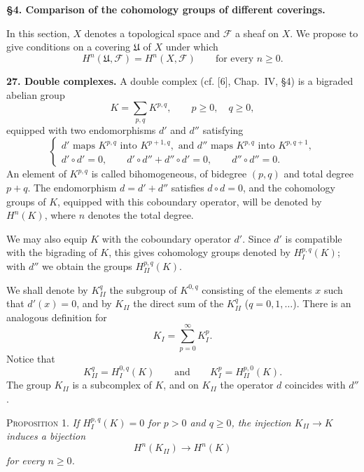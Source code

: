 
\medskip
{}\label{fac:I:4}
\textbf{\S4. Comparison of the cohomology groups of different coverings.}

In this section, $X$ denotes a topological space and $\mathcal{F}$ a sheaf on $X$. We propose to give conditions on a covering $\mathfrak{U}$ of $X$ under which
\[
H^n(\mathfrak{U},\mathcal{F})=H^n(X,\mathcal{F})
\qquad\text{for every }n\geq0.
\]

\medskip
{}\label{fac:I:4:no:27}
\textbf{27. Double complexes.}
A double complex (cf. [6], Chap.~IV, \S4) is a bigraded abelian group
\[
K=\sum_{p,q}K^{p,q},
\qquad p\geq0,\quad q\geq0,
\]
equipped with two endomorphisms $d'$ and $d''$ satisfying
\[
\begin{cases}
d'\text{ maps }K^{p,q}\text{ into }K^{p+1,q},
  \text{ and }d''\text{ maps }K^{p,q}\text{ into }K^{p,q+1},\\
d'\circ d'=0,\qquad d'\circ d''+d''\circ d'=0,
  \qquad d''\circ d''=0.
\end{cases}
\]
An element of $K^{p,q}$ is called bihomogeneous, of bidegree $(p,q)$ and total degree $p+q$. The endomorphism $d=d'+d''$ satisfies $d\circ d=0$, and the cohomology groups of $K$, equipped with this coboundary operator, will be denoted by $H^n(K)$, where $n$ denotes the total degree.

We may also equip $K$ with the coboundary operator $d'$. Since $d'$ is compatible with the bigrading of $K$, this gives cohomology groups denoted by $H_I^{p,q}(K)$; with $d''$ we obtain the groups $H_{II}^{p,q}(K)$.

We shall denote by $K_{II}^q$ the subgroup of $K^{0,q}$ consisting of the elements $x$ such that $d'(x)=0$, and by $K_{II}$ the direct sum of the $K_{II}^q$ ($q=0,1,\ldots$). There is an analogous definition for
\[
K_I=\sum_{p=0}^{\infty}K_I^p.
\]
Notice that
\[
K_{II}^q=H_I^{0,q}(K)
\qquad\text{and}\qquad
K_I^p=H_{II}^{p,0}(K).
\]
The group $K_{II}$ is a subcomplex of $K$, and on $K_{II}$ the operator $d$ coincides with $d''$.

\label{fac:I:4:no:27:prop:1}
\textsc{Proposition 1.} \textit{If $H_I^{p,q}(K)=0$ for $p>0$ and $q\geq0$, the injection $K_{II}\to K$ induces a bijection}
\[
H^n(K_{II})\longrightarrow H^n(K)
\]
\textit{for every $n\geq0$.}

